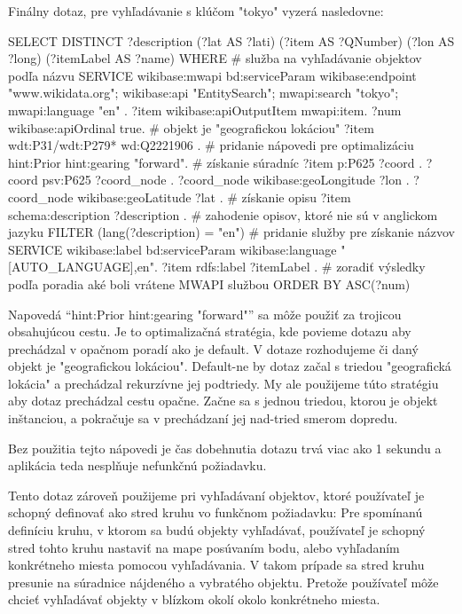 Finálny dotaz, pre vyhľadávanie s klúčom "tokyo" vyzerá nasledovne:
\begin{code}
      SELECT DISTINCT
      ?description
      (?lat AS ?lati)
      (?item AS ?QNumber)
      (?lon AS ?long)
      (?itemLabel AS ?name)
      WHERE {
      # služba na vyhľadávanie objektov podľa názvu
      SERVICE wikibase:mwapi {
      bd:serviceParam wikibase:endpoint "www.wikidata.org";
      wikibase:api "EntitySearch";
      mwapi:search "tokyo";
      mwapi:language "en" .
      ?item wikibase:apiOutputItem mwapi:item.
      ?num wikibase:apiOrdinal true. }
      # objekt je "geografickou lokáciou"
      ?item wdt:P31/wdt:P279* wd:Q2221906 .
      # pridanie nápovedi pre optimalizáciu
      hint:Prior hint:gearing "forward".
      # získanie súradníc
      ?item p:P625 ?coord .
      ?coord psv:P625 ?coord_node .
      ?coord_node wikibase:geoLongitude ?lon .
      ?coord_node wikibase:geoLatitude ?lat .
      # získanie opisu
      ?item schema:description ?description .
      # zahodenie opisov, ktoré nie sú v anglickom jazyku
      FILTER (lang(?description) = "en")
      # pridanie služby pre získanie názvov
      SERVICE wikibase:label {
      bd:serviceParam wikibase:language "[AUTO_LANGUAGE],en".
      ?item rdfs:label ?itemLabel .
      }
      # zoradiť výsledky podľa poradia aké boli vrátene MWAPI službou
      } ORDER BY ASC(?num)
\end{code}

Napovedá “hint:Prior hint:gearing "forward"” sa môže použiť za trojicou obsahujúcou cestu.
Je to optimalizačná stratégia, kde povieme dotazu aby prechádzal v opačnom poradí ako je default.
V dotaze rozhodujeme či daný objekt je "geografickou lokáciou".
Default-ne by dotaz začal s triedou "geografická lokácia" a prechádzal rekurzívne jej podtriedy.
My ale použijeme túto stratégiu aby dotaz prechádzal cestu opačne. Začne sa s jednou triedou, ktorou je
objekt inštanciou, a pokračuje sa v prechádzaní jej nad-tried smerom dopredu.

Bez použitia tejto nápovedi je čas dobehnutia dotazu trvá viac ako 1 sekundu a aplikácia teda nesplňuje nefunkčnú požiadavku.

Tento dotaz zároveň použijeme pri vyhľadávaní objektov, ktoré používateľ je schopný definovať ako stred kruhu vo funkčnom požiadavku:
Pre spomínanú definíciu kruhu, v ktorom sa budú objekty vyhľadávať, používateľ je schopný stred tohto kruhu nastaviť na mape posúvaním bodu, alebo
vyhľadaním konkrétneho miesta pomocou vyhľadávania. V takom prípade sa stred kruhu presunie na súradnice nájdeného a vybratého objektu. Pretože používateľ
môže chcieť vyhľadávať objekty v blízkom okolí okolo konkrétneho miesta.

